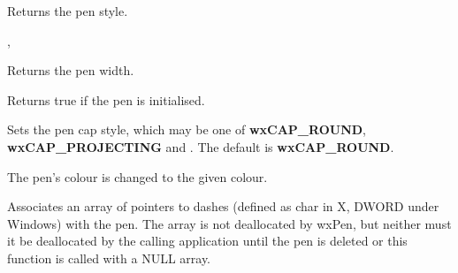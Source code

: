 

\label{wxpengetstyle}


Returns the pen style.


, 

\label{wxpengetwidth}


Returns the pen width.



\label{wxpenisok}


Returns true if the pen is initialised.

\label{wxpensetcap}


Sets the pen cap style, which may be one of {\bf wxCAP\_ROUND}, {\bf wxCAP\_PROJECTING} and
. The default is {\bf wxCAP\_ROUND}.



\label{wxpensetcolour}




The pen's colour is changed to the given colour.



\label{wxpensetdashes}


Associates an array of pointers to dashes (defined as char in X, DWORD under Windows)
with the pen. The array is not deallocated by wxPen, but neither must it be
deallocated by the calling application until the pen is deleted or this
function is called with a NULL array.

